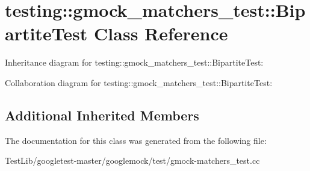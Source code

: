 \hypertarget{classtesting_1_1gmock__matchers__test_1_1BipartiteTest}{}\section{testing\+:\+:gmock\+\_\+matchers\+\_\+test\+:\+:Bipartite\+Test Class Reference}
\label{classtesting_1_1gmock__matchers__test_1_1BipartiteTest}


Inheritance diagram for testing\+:\+:gmock\+\_\+matchers\+\_\+test\+:\+:Bipartite\+Test\+:


Collaboration diagram for testing\+:\+:gmock\+\_\+matchers\+\_\+test\+:\+:Bipartite\+Test\+:
\subsection*{Additional Inherited Members}


The documentation for this class was generated from the following file\+:\begin{DoxyCompactItemize}
\item 
Test\+Lib/googletest-\/master/googlemock/test/gmock-\/matchers\+\_\+test.\+cc\end{DoxyCompactItemize}
